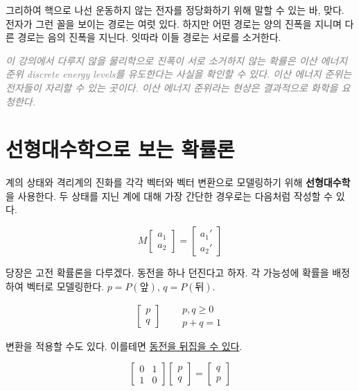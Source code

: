 \documentclass[a4paper,chapter,atbegshi,hidelinks]{oblivoir}
\begin{document}
\newpage
그리하여 핵으로 나선 운동하지 않는 전자를 정당화하기 위해 말할 수 있는 바,
맞다. 전자가 그런 꼴을 보이는 경로는 여럿 있다. 하지만 어떤 경로는 양의 진폭을
지니며 다른 경로는 음의 진폭을 지닌다. 잇따라 이들 경로는 서로를 소거한다. 

\hfill

\hfill\parbox[t]{9cm}{\textcolor{gray}{\itshape 이 강의에서 다루지 않을 
물리학으로 진폭이 서로 소거하지 않는 확률은 이산 에너지 준위{\footnotesize
discrete energy levels}를 유도한다는 사실을 확인할 수 있다. 이산 에너지
준위는 전자들이 자리할 수 있는 곳이다. 이산 에너지 준위라는 현상은 결과적으로
화학을 요청한다.}}

\section{선형대수학으로 보는 확률론}

계의 상태와 격리계의 진화를 각각 벡터와 벡터 변환으로 모델링하기 위해 
\textbf{선형대수학}을 사용한다. 두 상태를 지닌 계에 대해 가장 간단한
경우로는 다음처럼 작성할 수 있다.

\begin{equation}
M \begin{bmatrix} a_1\\a_2 \end{bmatrix} = 
\begin{bmatrix} a_1'\\ a_2' \end{bmatrix}
\end{equation}

당장은 고전 확률론을 다루겠다. 동전을 하나 던진다고 하자. 각 가능성에 
확률을 배정하여 벡터로 모델링한다. $p = P(\textrm{앞})$, $q = P(\textrm{뒤})$.

\begin{equation}
  \begin{bmatrix}p\\q\end{bmatrix}\quad
  \begin{aligned}
    &p,q \geq 0 \\
    &p+q = 1
  \end{aligned}
\end{equation}

변환을 적용할 수도 있다. 이를테면 \underline{동전을 뒤집을 수 있다}.

\begin{equation}
  \begin{bmatrix} 0 & 1 \\ 1 & 0 \end{bmatrix}
  \begin{bmatrix} p \\ q \end{bmatrix} = 
  \begin{bmatrix} q \\ p \end{bmatrix}
\end{equation}
\end{document}

